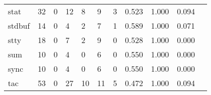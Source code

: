 \begin{longtable}{lp{1.20cm}p{1.20cm}p{1.20cm}p{1.20cm}p{1.20cm}p{1.20cm}p{1.20cm}p{1.20cm}p{1.20cm}p{1.20cm}}
stat      &                                    32 &                                                  0 &                                                 12 &                                                  8 &                                                  9 &                                                  3 &                                         0.523 &                                              1.000 &                                              0.094 \\
stdbuf    &                                    14 &                                                  0 &                                                  4 &                                                  2 &                                                  7 &                                                  1 &                                         0.589 &                                              1.000 &                                              0.071 \\
stty      &                                    18 &                                                  0 &                                                  7 &                                                  2 &                                                  9 &                                                  0 &                                         0.528 &                                              1.000 &                                              0.000 \\
sum       &                                    10 &                                                  0 &                                                  4 &                                                  0 &                                                  6 &                                                  0 &                                         0.550 &                                              1.000 &                                              0.000 \\
sync      &                                    10 &                                                  0 &                                                  4 &                                                  0 &                                                  6 &                                                  0 &                                         0.550 &                                              1.000 &                                              0.000 \\
tac       &                                    53 &                                                  0 &                                                 27 &                                                 10 &                                                 11 &                                                  5 &                                         0.472 &                                              1.000 &                                              0.094 \\

\end{longtable}
